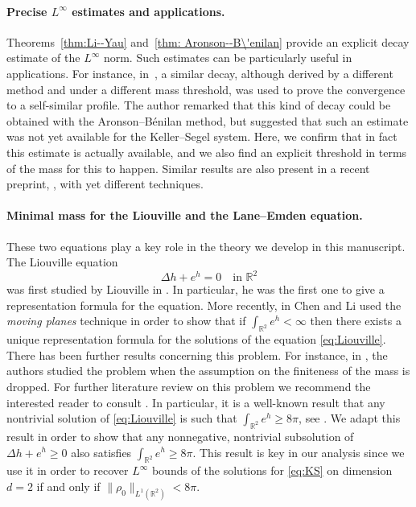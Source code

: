 \documentclass[11pt,a4paper]{article}
\numberwithin{equation}{section}
\newcommand{\R}{{\mathbb{R}}}
\theoremstyle{plain}
\theoremstyle{remark}
\newcounter{review}
\begin{document}
\paragraph{Precise $L^{\infty}$ estimates and applications.} 

Theorems~\ref{thm:Li--Yau} and~\ref{thm: Aronson--B\'enilan} provide an explicit decay estimate of the $L^{\infty}$ norm. Such estimates can be particularly useful in applications. For instance, in~\cite{Bedrossian11}, a similar decay, although derived by a different method and under a different mass threshold, was used to prove the convergence to a self-similar profile. The author remarked that this kind of decay could be obtained with the Aronson–B\'enilan method, but suggested that such an estimate was not yet available for the Keller–Segel system. Here, we confirm that in fact this estimate is actually available, and we also find an explicit threshold in terms of the mass for this to happen. Similar results are also present in a recent preprint, \cite{LisMai}, with yet different techniques.

\paragraph{Minimal mass for the Liouville and the Lane--Emden equation.}

These two equations play a key role in the theory we develop in this manuscript. The Liouville equation
\begin{equation}\label{eq:Liouville}
    \Delta h + e^{h} = 0 \quad \text{in } \R^2
\end{equation}
was first studied by Liouville in \cite{Liouville1853}. In particular, he was the first one to give a representation formula for the equation. More recently, in \cite{Chen_Li91} Chen and Li used the \textit{moving planes} technique in order to show that if $\int_{\R^2} e^h < \infty$ then there exists a unique representation formula for the solutions of the equation \eqref{eq:Liouville}.
There has been further results concerning this problem. For instance, in \cite{Chou_Wan94}, the authors studied the problem when the assumption on the finiteness of the mass is dropped. For further literature review on this problem we recommend the interested reader to consult \cite{Chang04}. In particular, it is a well-known result that any nontrivial solution of \eqref{eq:Liouville} is such that $\int_{\R^2} e^h \geq 8\pi$, see \cite[Lemma 1.1]{Chen_Li91}. We adapt this result in order to show that any nonnegative, nontrivial subsolution of $\Delta h + e^h \geq 0$ also satisfies $\int_{\R^2} e^h \geq 8 \pi$. This result is key in our analysis since we use it in order to recover $L^\infty$ bounds of the solutions for \eqref{eq:KS} on dimension $d=2$ if and only if $\| \rho_0 \|_{L^1(\R^2)} < 8 \pi$. 
\end{document}
